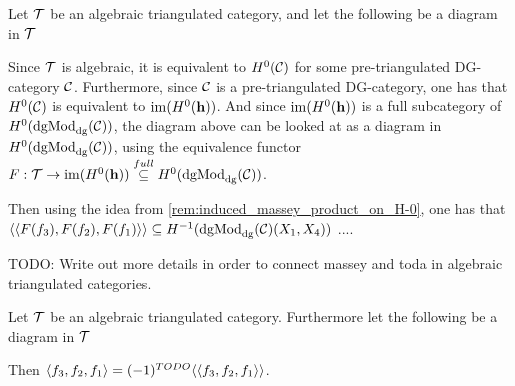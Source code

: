 \begin{remark}
    Let \( {\mathcal{T}} \) be an algebraic triangulated category, and let the following be a diagram in \( {\mathcal{T}} \)
    \begin{center}
    \end{center}

    Since \( {\mathcal{T}} \) is algebraic, it is equivalent to \( H^0({\mathcal{C}}) \) for some pre-triangulated DG-category \( {\mathcal{C}} \). Furthermore, since \( {\mathcal{C}} \) is a pre-triangulated DG-category, one has that \( H^0({\mathcal{C}}) \) is equivalent to \( \operatorname{im}(H^0(\mathbf{h})) \). And since \( \operatorname{im}(H^0(\mathbf{h})) \) is a full subcategory of \( H^0(\operatorname{dgMod}_{\operatorname{dg}}({\mathcal{C}})) \), the diagram above can be looked at as a diagram in \( H^0(\operatorname{dgMod}_{\operatorname{dg}}({\mathcal{C}})) \), using the equivalence functor \( F: {\mathcal{T}} \to \operatorname{im}(H^0(\mathbf{h})) \stackrel{full}{\subseteq} H^0(\operatorname{dgMod}_{\operatorname{dg}}({\mathcal{C}})) \).
    \begin{center}
    \end{center}
    Then using the idea from \autoref{rem:induced_massey_product_on_H-0}, one has that \( \langle\langle F(f_3), F(f_2), F(f_1) \rangle\rangle \subseteq H^{-1}(\operatorname{dgMod}_{\operatorname{dg}}({\mathcal{C}})(X_1, X_4)) \) ....

    TODO: Write out more details in order to connect massey and toda in algebraic triangulated categories.
\end{remark}

\begin{theorem}
    Let \( {\mathcal{T}} \) be an algebraic triangulated category. Furthermore let the following be a diagram in \( {\mathcal{T}} \)
    \begin{center}
    \end{center}
    Then \( \langle f_3, f_2, f_1 \rangle = (-1)^{TODO} \langle\langle f_3, f_2, f_1 \rangle\rangle \).
\end{theorem}